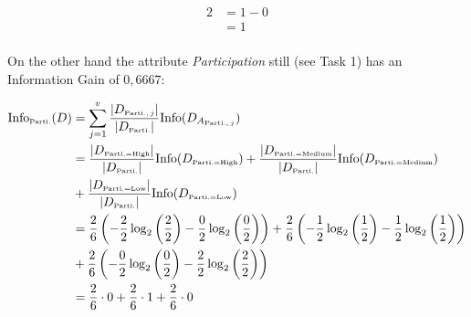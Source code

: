 \documentclass[
english,
smallborders
]{i6prcsht}
\newcommand{\OfSpecificValue}[3]{_{\text{\tiny #1#2#3}}}
\newcommand{\OfAttribute}[1]{_{\text{\tiny #1}}}
\begin{document}
\begin{solution}
\begin{alignat*}{2}
		                                  & = 1 - 0                                                                                                                                                                                                              \\
		                                  & = 1                                                                                                                                                                                                                  \\
	\end{alignat*}
	
	On the other hand the attribute \textit{Participation} still (see Task 1) has an Information Gain of $0,6667$:
	
	\begin{alignat*}{3}
		\text{Info}\OfAttribute{Parti.}(D) & = \sum_{j=1}^v \frac{|D\OfAttribute{Parti.$,j$}|}{|D\OfAttribute{Parti.}|} \text{Info}(D_{A\OfAttribute{Parti.$,j$}})                                                                                                                             \\
		                                   & = \frac{|D\OfSpecificValue{Parti.}{=}{High}|}{|D\OfAttribute{Parti.}|} \text{Info}(D\OfSpecificValue{Parti.}{=}{High}) + \frac{|D\OfSpecificValue{Parti.}{=}{Medium}|}{|D\OfAttribute{Parti.}|} \text{Info}(D\OfSpecificValue{Parti.}{=}{Medium}) \\
		                                   & + \frac{|D\OfSpecificValue{Parti.}{=}{Low}|}{|D\OfAttribute{Parti.}|} \text{Info}(D\OfSpecificValue{Parti.}{=}{Low})                                                                                                                              \\
		                                   & = \frac{2}{6} \left(-\frac{2}{2} \log_2\left(\frac{2}{2}\right) - \frac{0}{2} \log_2\left(\frac{0}{2}\right)\right) + \frac{2}{6} \left(-\frac{1}{2} \log_2\left(\frac{1}{2}\right) - \frac{1}{2} \log_2\left(\frac{1}{2}\right)\right)           \\
		                                   & + \frac{2}{6} \left(-\frac{0}{2} \log_2\left(\frac{0}{2}\right) - \frac{2}{2} \log_2\left(\frac{2}{2}\right)\right)                                                                                                                               \\
		                                   & = \frac{2}{6} \cdot 0 + \frac{2}{6} \cdot 1 + \frac{2}{6} \cdot 0                                                                                                                                                                                 \\

\end{alignat*}
\end{solution}
\end{document}
